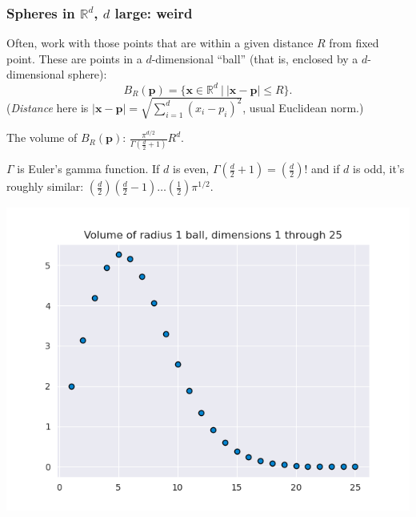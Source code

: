 \documentclass[smaller]{beamer}
\theoremstyle{example}
\newcommand{\x}{\textbf{x}}
\begin{document}
\begin{frame}
    \frametitle{Spheres in $\mathbb R^d$, $d$ large: weird}
    Often, work with those points that are within a given distance $R$ from fixed point. These are points in a $d$-dimensional ``ball'' (that is, enclosed by a $d$-dimensional sphere): 
            \[B_R(\textbf{p}) = \{\x\in\mathbb R^d\ |\ |\x - \textbf{p}| \le R\}.\]
    \pause
    (\textit{Distance} here is $|\x - \textbf{p}| = \sqrt{\sum_{i=1}^d(x_i-p_i)^2}$, usual Euclidean norm.)

    \pause
    \vspace{\baselineskip}
    The volume of $B_R(\textbf{p})$: \qquad $\frac{\pi^{d/2}}{\Gamma(\frac{d}{2} + 1)}R^d$.

    \vspace{\baselineskip}
    $\Gamma$ is Euler's gamma function. If $d$ is even, $\Gamma(\frac{d}{2}+1) = (\frac{d}{2})!$ and if $d$ is odd, it's roughly similar: $(\frac{d}{2})(\frac{d}{2}-1)\ldots(\frac12)\pi^{1/2}$.

    \pause
    \centering
    \includegraphics[height = 0.3\textheight]{../../Images/UnitBallVolume.png}

\end{frame}
\end{document}
